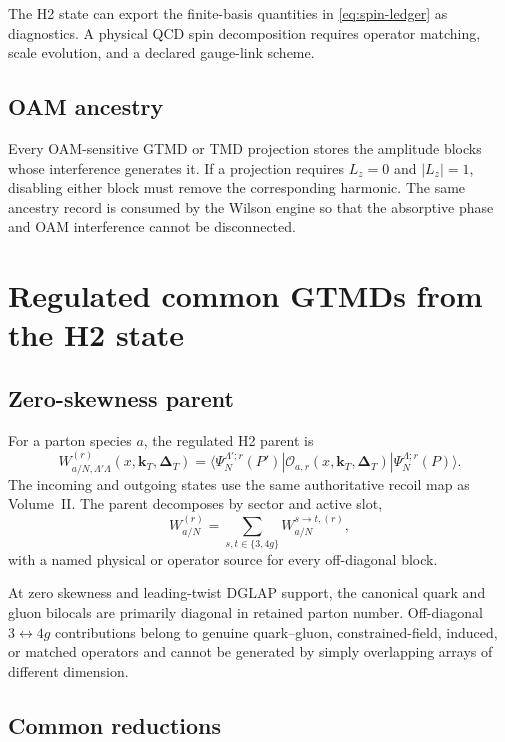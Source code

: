 \documentclass[11pt]{article}
\newcommand{\kT}{\bm{k}_{T}}
\newcommand{\DT}{\bm{\Delta}_{T}}
\newcommand{\cO}{\mathcal O}
\begin{document}
The H2 state can export the finite-basis quantities in
\cref{eq:spin-ledger} as diagnostics.  A physical QCD spin decomposition
requires operator matching, scale evolution, and a declared gauge-link scheme.

\subsection{OAM ancestry}

Every OAM-sensitive GTMD or TMD projection stores the amplitude blocks whose
interference generates it.  If a projection requires \(L_z=0\) and
\(|L_z|=1\), disabling either block must remove the corresponding harmonic.
The same ancestry record is consumed by the Wilson engine so that the
absorptive phase and OAM interference cannot be disconnected.

\section{Regulated common GTMDs from the H2 state}

\subsection{Zero-skewness parent}

For a parton species \(a\), the regulated H2 parent is
\begin{equation}
 W_{a/N,\Lambda'\Lambda}^{(r)}
 (x,\kT,\DT)
 =
 \langle\Psi_N^{\Lambda';r}(P')|
 \cO_{a,r}(x,\kT,\DT)
 |\Psi_N^{\Lambda;r}(P)\rangle.
 \label{eq:h2-gtmd}
\end{equation}
The incoming and outgoing states use the same authoritative recoil map as
Volume~II.  The parent decomposes by sector and active slot,
\begin{equation}
 W_{a/N}^{(r)}
 =
 \sum_{s,t\in\{3,4g\}}
 W_{a/N}^{s\to t,(r)},
\end{equation}
with a named physical or operator source for every off-diagonal block.

At zero skewness and leading-twist DGLAP support, the canonical quark and gluon
bilocals are primarily diagonal in retained parton number.  Off-diagonal
\(3\leftrightarrow4g\) contributions belong to genuine quark--gluon,
constrained-field, induced, or matched operators and cannot be generated by
simply overlapping arrays of different dimension.

\subsection{Common reductions}
\end{document}
